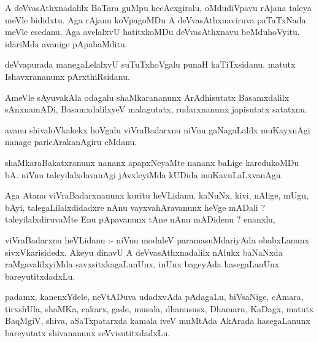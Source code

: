 \documentclass{article}
\begin{document}
\begin{mn}
A  deVvasAthxnadalilx  BaTara  guMpu  hecAcxgiralu,  oMdudiVpavu  rAjana  taleya  meVle  bididxtu.  
Aga  rAjanu  koVpagoMDu  A  deVvasAthxnaviruva  paTaTxNada  meVle  esedanu.  Aga  avelalxvU  hatitxkoMDu  
deVvasAthxnavu  beMduhoVyitu.  idariMda  avanige  pApabaMditu.
\end{mn}

\begin{mn}
deVvapurada  manegaLelalxvU  suTuTxhoVgalu  punaH  kaTiTxsidanu.  matutx  Ishavxrananunx  pArxthiRsidanu.
\end{mn}

\begin{mn}
AmeVle  sAyuvakAla  odagalu  shaMkarananunx  ArAdhisutatx  Basamxdalilx  sAnxnamADi,  BasamxdalilxyeV  
malagutatx,  rudarxnanunx  japisutatx  satatxnu.
\end{mn}

\begin{mn}
avanu  shivaloVkakekx  hoVgalu  viVraBadarxnu  niVnu  gaNagaLalilx  muKayxnAgi  nanage  paricArakanAgiru  eMdanu.
\end{mn}

\begin{mn}
shaMkaraBakatxranunx  nananx  apapxNeyaMte  nananx  baLige  karedukoMDu  bA.  niVnu  taleyilalxdavanAgi  
jAvxleyiMda  kUDida  muKavuLaLxvanAgu.
\end{mn}

\begin{mn}
Aga  Atanu  viVraBadarxnanunx  kuritu  heVLidanu.  kaNuNx,  kivi,  nAlige,  mUgu,  bAyi,  talegaLilalxdidadxre  
nAnu  vayxvahAravanunx  heVge  mADali ?  taleyilalxdiruvaMte  Enu  pApavanunx  tAne  nAnu  mADidenu ?  enanxlu,
\end{mn}

\begin{mn}
viVraBadarxnu  heVLidanu :- niVnu  modaleV  paramasuMdariyAda  obabxLanunx  sivxVkarisidedx.  Akeyu  dinavU  A  
deVvasAthxnadalilx  nAlukx  baNaNxda raMgavalilxyiMda  savxsitxkagaLanUnx,  inUnx  bageyAda  hasegaLanUnx  bareyutitxdadxLu.
\end{mn}

\begin{mn}
padamx,  kanenxYdele,  neVtADuva  udadxvAda  pAdagaLu,  biVsaNige,  cAmara,  tirxshUla,  shaMKa,  cakarx,  
gade,  musala,  dhanususx,  Dhamaru,  KaDagx,  matutx  BaqMgiV,  shiva,  aSaTxpatarxda  kamala  iveV  muMtAda  
AkArada  hasegaLanunx  bareyutatx  shivananunx  seVvisutitxdadxLu.
\end{mn}
\end{document}
